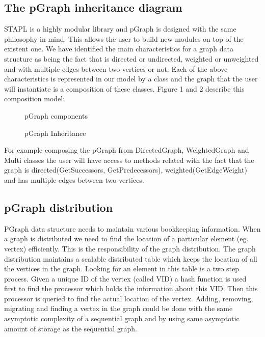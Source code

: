 \documentclass[12pt,epsfig]{article}
\begin{document}
\subsection{The pGraph inheritance diagram}


STAPL is a highly modular library and pGraph is designed with the same
philosophy in mind. This allows the user to build new modules on top
of the existent one. We have identified the main characteristics for
a graph data structure as being the fact that is directed or
undirected, weighted or unweighted and with multiple edges between two
vertices or not. Each of the above characteristics is represented in
our model by a class and the graph that the user will instantiate is a
composition of these classes. Figure 1 and 2 describe this composition
model:

\begin{figure}
    \caption{pGraph components}
    \label{fig:fig1}
\end{figure}
\begin{figure}
    \caption{pGraph Inheritance}
    \label{fig:fig2}
\end{figure}

For example composing the pGraph from DirectedGraph, WeightedGraph and
Multi classes the user will have access to methods related with the
fact that the graph is directed(GetSuccessors, GetPredecessors),
weighted(GetEdgeWeight) and has multiple edges between two vertices.



\subsection{pGraph distribution}

PGraph data structure needs to maintain various bookkeeping information.
When a graph is distributed we need to find the location of a
particular element (eg. vertex) efficiently. This is the
responsibility of the graph distribution. The graph distribution
maintains a scalable distributed table which keeps the location of all
the vertices in the graph. Looking for an element in this table is a
two step process. Given a unique ID of the vertex (called VID) a hash
function is used first to find the processor which holds the
information about this VID. Then this processor is queried to find the
actual location of the vertex. Adding, removing, migrating and finding
a vertex in the graph could be done with the same asymptotic
complexity of a sequential graph and by using same asymptotic amount
of storage as the sequential graph.
\end{document}
